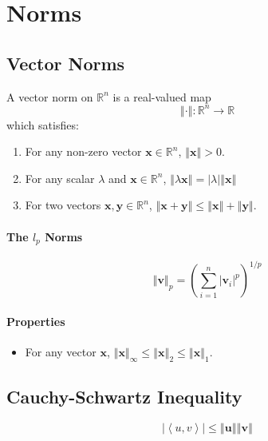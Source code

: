 \documentclass[twocolumn,english]{article}
\begin{document}
\section{Norms}

\subsection{Vector Norms}

A vector norm on $\mathbb{R}^{n}$ is a real-valued map 
\[
\left\Vert \cdot\right\Vert :\mathbb{R}^{n}\rightarrow\mathbb{R}
\]
which satisfies:
\begin{enumerate}
\item For any non-zero vector $\boldsymbol{x}\in\mathbb{R}^{n}$, $\left\Vert \boldsymbol{x}\right\Vert >0$.
\item For any scalar $\lambda$ and $\boldsymbol{x}\in\mathbb{R}^{n}$,
$\left\Vert \lambda\boldsymbol{x}\right\Vert =\left|\lambda\right|\left\Vert \boldsymbol{x}\right\Vert $
\item For two vectors $\boldsymbol{x},\boldsymbol{y}\in\mathbb{R}^{n}$,
$\left\Vert \boldsymbol{x}+\boldsymbol{y}\right\Vert \leq\left\Vert \boldsymbol{x}\right\Vert +\left\Vert \boldsymbol{y}\right\Vert $.
\end{enumerate}

\paragraph{The $l_{p}$ Norms}

\[
\left\Vert \boldsymbol{v}\right\Vert _{p}=\left(\sum_{i=1}^{n}\left|\boldsymbol{v}_{i}\right|^{p}\right)^{1/p}
\]

\paragraph{Properties}
\begin{itemize}
\item For any vector $\boldsymbol{x}$, $\left\Vert \boldsymbol{x}\right\Vert _{\infty}\leq\left\Vert \boldsymbol{x}\right\Vert _{2}\leq\left\Vert \boldsymbol{x}\right\Vert _{1}$.
\end{itemize}

\subsection{Cauchy-Schwartz Inequality}

\[
\left|\left\langle u,v\right\rangle \right|\leq\left\Vert \boldsymbol{u}\right\Vert \left\Vert \boldsymbol{v}\right\Vert 
\]
\end{document}
